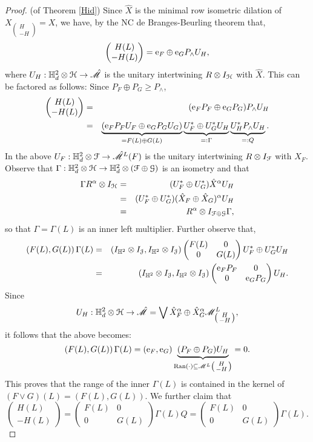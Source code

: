 \documentclass[11pt]{article}
\newcommand{\ba}{\begin{eqnarray}}
\newcommand{\ea}{\end{eqnarray}}
\newcommand{\bpm}{\begin{pmatrix}}
\newcommand{\epm}{\end{pmatrix}}
\newcommand{\bsm}{\left ( \begin{smallmatrix}}
\newcommand{\esm}{\end{smallmatrix} \right) }
\newcommand{\nn}{\nonumber}
\newcommand{\mr}{\ensuremath{\mathrm}}
\newcommand{\scr}{\ensuremath{\mathscr}}
\newcommand{\mc}{\ensuremath{\mathcal}}
\newcommand{\Ga}{\ensuremath{\Gamma}}
\def\bH{\mathbb{H}}
\def\cJ{\mathcal{J}}
\newcommand{\ran}[1]{\ensuremath{\mathrm{Ran} \left( {#1} \right) }}
\numberwithin{equation}{section}
\numberwithin{subsection}{section}
\theoremstyle{definition}
\begin{document}
\begin{proof}{(of Theorem \ref{Hid})}
Since $\hat{X}$ is the minimal row isometric dilation of $X_{\bsm H \\ - H \esm} =X$, we have, by the NC de Branges-Beurling theorem that,
$$ \bpm H (L) \\ - H(L) \epm = \mr{e} _F \oplus \mr{e} _G P _\wedge U_H, $$ where 
$U_H : \bH ^2 _d \otimes \mc{H} \rightarrow \hat{\scr{M}}$ is the unitary intertwining $R \otimes I_\mc{H}$ with $\hat{X}$. This can be factored as follows: Since $P_F \oplus P_G \geq P_\wedge$,
\ba \bpm H (L) \\ - H(L) \epm &= & (\mr{e} _F P_F \oplus \mr{e} _G  P_G ) P _\wedge U_H \nn \\
& = & \underbrace{(\mr{e} _F P_F U_F \oplus \mr{e} _G  P_G U_G )}_{=F(L) \oplus G(L)} \underbrace{U_F ^* \oplus U_G ^* U_H}_{=: \Ga } \underbrace{U_H ^* P_\wedge U_H}_{=:Q}. \nn \ea 
In the above $U_F : \bH ^2 _d \otimes \mc{F} \rightarrow \hat{\scr{M} } ^L (F)$ is the unitary intertwining $R\otimes I_\mc{F}$ with $\hat{X} _F$. Observe that $\Ga : \bH ^2 _d \otimes \mc{H} \rightarrow \bH ^2 _d \otimes (\mc{F} \oplus \mc{G} )$ is an isometry and that
\ba \Ga R^\alpha \otimes I_{\mc{H}} & = & (U_F ^* \oplus U_G ^*) \hat{X} ^\alpha U_H \nn \\
& =& (U_F ^* \oplus U_G ^*) (\hat{X}_F \oplus \hat{X} _G) ^\alpha U_H \nn \\
& = & R^\alpha \otimes I_{\mc{F} \oplus \mc{G}} \Ga, \nn \ea so that $\Ga = \Ga (L)$ is an inner left multiplier.  Further observe that,
\ba \left( F (L), G(L) \right) \Ga (L) & = & \left( I_{\bH^2} \otimes I_\cJ , I _{\bH ^2} \otimes I_\cJ \right) \bpm F(L) & 0 \\ 0 & G(L) \epm U_F ^* \oplus U_G ^* U_H \nn \\
& = & \left( I_{\bH^2} \otimes I_\cJ , I _{\bH ^2} \otimes I_\cJ \right) \bpm \mr{e} _F P _F  & 0 \\ 0 & \mr{e} _G P_G  \epm U_H. \nn \ea 
Since $$ U_H : \bH ^2 _d \otimes \mc{H} \rightarrow \hat{\scr{M}} = \bigvee \hat{X}_F ^\alpha \oplus \hat{X}_G ^\alpha \scr{M} ^L _{\bsm H \\ - H \esm}, $$ it follows that the above becomes:
$$  \left( F (L), G(L) \right) \Ga (L) = ( \mr{e} _F , \mr{e} _G ) \underbrace{(P_F \oplus P_G ) U_H } _{\ran{\cdot} \subseteq \scr{M} ^L \bsm H \\ - H \esm} = 0. $$ This proves that the range of the inner $\Ga (L)$ is contained in the kernel of $(F \vee G) (L) = ( F (L) , G(L) )$.
We further claim that 
$$ \bpm H(L) \\ - H(L) \epm = \bpm F(L) & 0 \\ 0 & G(L) \epm \Ga (L) Q = \bpm F(L) & 0 \\ 0 & G(L) \epm \Ga (L). $$ 

\end{proof}
\end{document}
